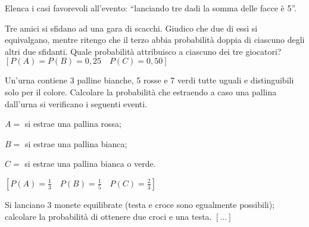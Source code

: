 \begin{esercizio}
 \label{ese:9.7}
Elenca i casi favorevoli all'evento: 
``lanciando tre dadi la somma delle facce è 5''.
\end{esercizio}
% 
% 

\begin{esercizio}[\Ast]
 \label{ese:9.10}
Tre amici si sfidano ad una gara di scacchi. Giudico che due di essi si 
equivalgano, mentre ritengo che il terzo abbia probabilità doppia di ciascuno 
degli altri due sfidanti. Quale probabilità attribuisco a ciascuno dei tre 
giocatori?
\hfill \(\left[P(A)=P(B)=0,25 \quad P(C)=0,50\right]\)
\end{esercizio}

\begin{esercizio}[\Ast]
 \label{ese:9.11}
Un'urna contiene 3 palline bianche, 5 rosse e 7 verdi tutte uguali e 
distinguibili solo per il colore. Calcolare la probabilità che estraendo a caso 
una pallina dall'urna si verificano i seguenti eventi.
\begin{itemize*}
\item \( A= \) si estrae una pallina rossa;
\item \( B= \) si estrae una pallina bianca;
\item \( C= \) si estrae una pallina bianca o verde.
\end{itemize*}
\hfill \(\left[P(A)=\frac{1}{3}\quad P(B)=\frac{1}{5} \quad 
        P(C)=\frac{2}{3}\right]\)
\end{esercizio}

\begin{esercizio}
 \label{ese:9.12}
Si lanciano 3 monete equilibrate (testa e croce sono egualmente possibili); 
calcolare la probabilità di ottenere due croci e una testa.
\hfill \(\left[...\right]\)
\end{esercizio}

